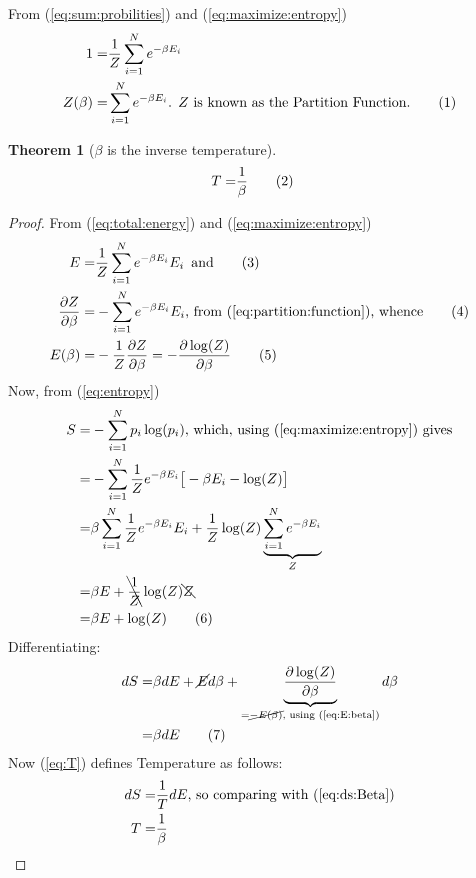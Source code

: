 \documentclass[]{article}
\newcommand\numberthis{\addtocounter{equation}{1}\tag{\theequation}}
\newtheorem{thm}{Theorem}
\begin{document}
From (\ref{eq:sum:probilities}) and (\ref{eq:maximize:entropy})
\begin{align*}
1 =& \frac{1}{Z}  \sum_{i=1}^{N} e^{-\beta E_i}\\
Z(\beta) =& \sum_{i=1}^{N} e^{-\beta E_i} \text{. $Z$ is known as the Partition Function.} \numberthis \label{eq:partition:function}
\end{align*}

\begin{thm}[$\beta$ is the inverse temperature]\label{thm:inverseT}
	\begin{align*}
		T =& \frac{1}{\beta}\numberthis\label{eq:inverseT}
	\end{align*}
\end{thm}

\begin{proof}
	From (\ref{eq:total:energy}) and (\ref{eq:maximize:entropy})
	\begin{align*}
	E =& \frac{1}{Z}  \sum_{i=1}^{N} e^{-\beta E_i} E_i \text{\, and}\numberthis \label{eq:E}\\
	\frac{\partial Z}{\partial \beta} =& - \sum_{i=1}^{N} e^{-\beta E_i} E_i \text{, from (\ref{eq:partition:function}), whence} \numberthis \label{eq:dZ}\\
	E(\beta) =& - \frac{1}{Z} \frac{\partial Z}{\partial \beta} = - \frac{\partial \log(Z)}{\partial \beta} \numberthis \label{eq:E:beta}
	\end{align*}
	Now, from (\ref{eq:entropy}) 
	\begin{align*}
	S =& -\sum_{i=1}^{N} p_i \log(p_i) \text{, which, using  (\ref{eq:maximize:entropy}) gives}\\
	=& - \sum_{i=1}^{N} \frac{1}{Z} e^{- \beta E_i}\big[- \beta E_i -\log(Z)\big]\\
	=& \beta \sum_{i=1}^{N} \frac{1}{Z} e^{- \beta E_i}  E_i +  \frac{1}{Z} \log(Z) \underbrace{\sum_{i=1}^{N}  e^{- \beta E_i}}_{Z} \\
	=& \beta E +  \bcancel{\frac{1}{Z}} \log(Z)  \bcancel{Z}\\
	=& \beta E +   \log(Z)  \numberthis \label{eq:S_Z}
	\end{align*}
	Differentiating:
	\begin{align*}
	dS =& \beta dE + \cancel{E} d\beta + \underbrace{\frac{\partial \log(Z)}{\partial \beta}}_{=\cancel{-E(\beta)} \text{, using (\ref{eq:E:beta})}} d\beta\\
	=& \beta dE \numberthis \label{eq:ds:Beta}
	\end{align*}
	Now (\ref{eq:T}) defines Temperature as follows:
	\begin{align*}
	dS =& \frac{1}{T} dE \text{, so comparing with (\ref{eq:ds:Beta})} \\
	T =& \frac{1}{\beta}
	\end{align*}
\end{proof}
\end{document}
